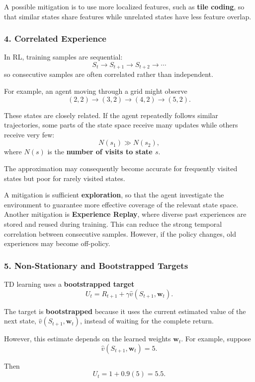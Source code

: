 \documentclass{scrartcl}
\theoremstyle{mytheoremstyle}
\theoremstyle{mytheoremstyle}
\theoremstyle{myproblemstyle}
\begin{document}
A possible mitigation is to use more localized features, such as \textbf{tile coding}, so that similar states share features while unrelated states have less feature overlap.

\subsubsection*{4. Correlated Experience}

In RL, training samples are sequential:
\[
    S_t \rightarrow S_{t+1} \rightarrow S_{t+2} \rightarrow \cdots
\]
so consecutive samples are often correlated rather than independent.

For example, an agent moving through a grid might observe
\[
    (2,2)\rightarrow(3,2)\rightarrow(4,2)\rightarrow(5,2).
\]

These states are closely related. If the agent repeatedly follows similar trajectories, some parts of the state space receive many updates while others receive very few:
\[
    N(s_1)\gg N(s_2),
\]
where $N(s)$ is the \textbf{number of visits to state $s$}.

The approximation may consequently become accurate for frequently visited states but poor for rarely visited states.

A mitigation is sufficient \textbf{exploration},  so that the agent investigate the environment to guarantee more effective coverage of the relevant state space. Another mitigation is \textbf{Experience Replay}, where diverse past experiences are stored and reused during training. This can reduce the strong temporal correlation between consecutive samples. However, if the policy changes, old experiences may become off-policy.

\subsubsection*{5. Non-Stationary and Bootstrapped Targets}

TD learning uses a \textbf{bootstrapped target}
\[
    U_t = R_{t+1} + \gamma \hat v(S_{t+1},\mathbf w_t).
\]

The target is \textbf{bootstrapped} because it uses the current estimated value of the next state,
$\hat v(S_{t+1},\mathbf w_t)$, instead of waiting for the complete return.

However, this estimate depends on the learned weights $\mathbf w_t$. For example, suppose
\[
    \hat v(S_{t+1},\mathbf w_t)=5.
\]

Then
\[
    U_t=1+0.9(5)=5.5.
\]
\end{document}
